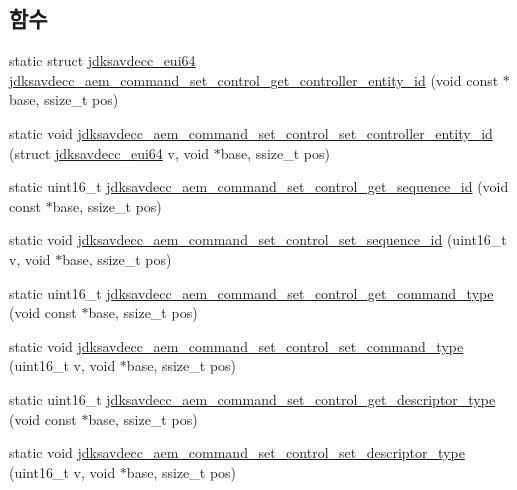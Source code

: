 \subsection*{함수}
\begin{DoxyCompactItemize}
\item 
static struct \hyperlink{structjdksavdecc__eui64}{jdksavdecc\+\_\+eui64} \hyperlink{group__command__set__control_ga75056fc12e1f314e085c35d996634bf0}{jdksavdecc\+\_\+aem\+\_\+command\+\_\+set\+\_\+control\+\_\+get\+\_\+controller\+\_\+entity\+\_\+id} (void const $\ast$base, ssize\+\_\+t pos)
\item 
static void \hyperlink{group__command__set__control_ga6358698175dec139dc8fa7c560bb567d}{jdksavdecc\+\_\+aem\+\_\+command\+\_\+set\+\_\+control\+\_\+set\+\_\+controller\+\_\+entity\+\_\+id} (struct \hyperlink{structjdksavdecc__eui64}{jdksavdecc\+\_\+eui64} v, void $\ast$base, ssize\+\_\+t pos)
\item 
static uint16\+\_\+t \hyperlink{group__command__set__control_ga9c61d62ed7f878afb6d6732e18552b11}{jdksavdecc\+\_\+aem\+\_\+command\+\_\+set\+\_\+control\+\_\+get\+\_\+sequence\+\_\+id} (void const $\ast$base, ssize\+\_\+t pos)
\item 
static void \hyperlink{group__command__set__control_ga9263a3289e09ab517d0136c602b47975}{jdksavdecc\+\_\+aem\+\_\+command\+\_\+set\+\_\+control\+\_\+set\+\_\+sequence\+\_\+id} (uint16\+\_\+t v, void $\ast$base, ssize\+\_\+t pos)
\item 
static uint16\+\_\+t \hyperlink{group__command__set__control_ga8e663c9d7eff45e09c9b1191f2983402}{jdksavdecc\+\_\+aem\+\_\+command\+\_\+set\+\_\+control\+\_\+get\+\_\+command\+\_\+type} (void const $\ast$base, ssize\+\_\+t pos)
\item 
static void \hyperlink{group__command__set__control_ga0c35ff088abf0c348dcf0c401d8fc478}{jdksavdecc\+\_\+aem\+\_\+command\+\_\+set\+\_\+control\+\_\+set\+\_\+command\+\_\+type} (uint16\+\_\+t v, void $\ast$base, ssize\+\_\+t pos)
\item 
static uint16\+\_\+t \hyperlink{group__command__set__control_ga65732c036039042631d50df57dc332fe}{jdksavdecc\+\_\+aem\+\_\+command\+\_\+set\+\_\+control\+\_\+get\+\_\+descriptor\+\_\+type} (void const $\ast$base, ssize\+\_\+t pos)
\item 
static void \hyperlink{group__command__set__control_gaa66eb8eb9dcc6d5a97040a225538bea0}{jdksavdecc\+\_\+aem\+\_\+command\+\_\+set\+\_\+control\+\_\+set\+\_\+descriptor\+\_\+type} (uint16\+\_\+t v, void $\ast$base, ssize\+\_\+t pos)
\item 

\end{DoxyCompactItemize}
